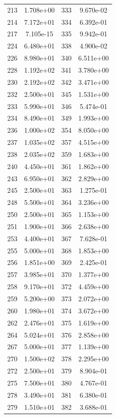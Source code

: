 \documentclass[12pt]{article}
\begin{document}
\begin{longtable}{@{}cccc@{}}
213 & 1.708e+00 & 333 & 9.670e-02 \\
214 & 7.172e+01 & 334 & 6.392e-01 \\
217 & 7.105e-15 & 335 & 9.942e-01 \\
224 & 6.480e+01 & 338 & 4.900e-02 \\
226 & 8.980e+01 & 340 & 6.511e+00 \\
228 & 1.192e+02 & 341 & 3.780e+00 \\
230 & 2.192e+02 & 342 & 3.471e+00 \\
232 & 2.500e+01 & 345 & 1.531e+00 \\
233 & 5.990e+01 & 346 & 5.474e-01 \\
234 & 8.490e+01 & 349 & 1.993e+00 \\
236 & 1.000e+02 & 354 & 8.050e+00 \\
237 & 1.035e+02 & 357 & 4.515e+00 \\
238 & 2.035e+02 & 359 & 1.683e+00 \\
240 & 4.450e+01 & 361 & 1.862e+00 \\
243 & 6.950e+01 & 362 & 2.829e+00 \\
245 & 2.500e+01 & 363 & 1.275e-01 \\
248 & 5.500e+01 & 364 & 3.236e+00 \\
250 & 2.500e+01 & 365 & 1.153e+00 \\
251 & 1.900e+01 & 366 & 2.638e+00 \\
253 & 4.400e+01 & 367 & 7.628e-01 \\
255 & 5.000e+01 & 368 & 1.853e+00 \\
256 & 1.851e+00 & 369 & 2.425e-01 \\
257 & 3.985e+01 & 370 & 1.377e+00 \\
258 & 9.170e+01 & 372 & 4.459e+00 \\
259 & 5.200e+00 & 373 & 2.072e+00 \\
260 & 1.980e+01 & 374 & 3.672e+00 \\
262 & 2.476e+01 & 375 & 1.619e+00 \\
264 & 5.024e+01 & 376 & 2.858e+00 \\
267 & 5.000e+01 & 377 & 1.139e+00 \\
270 & 1.500e+02 & 378 & 2.295e+00 \\
272 & 2.500e+01 & 379 & 8.904e-01 \\
275 & 7.500e+01 & 380 & 4.767e-01 \\
278 & 3.490e+01 & 381 & 6.380e-01 \\
279 & 1.510e+01 & 382 & 3.688e-01 \\

\end{longtable}
\end{document}
